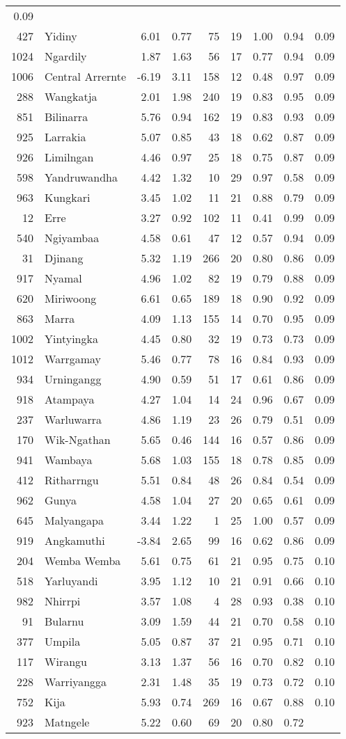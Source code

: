 \begin{longtable}[]{@{}rlrrrrrrr@{}}
0.09\tabularnewline
427 & Yidiny & 6.01 & 0.77 & 75 & 19 & 1.00 & 0.94 & 0.09\tabularnewline
1024 & Ngardily & 1.87 & 1.63 & 56 & 17 & 0.77 & 0.94 &
0.09\tabularnewline
1006 & Central Arrernte & -6.19 & 3.11 & 158 & 12 & 0.48 & 0.97 &
0.09\tabularnewline
288 & Wangkatja & 2.01 & 1.98 & 240 & 19 & 0.83 & 0.95 &
0.09\tabularnewline
851 & Bilinarra & 5.76 & 0.94 & 162 & 19 & 0.83 & 0.93 &
0.09\tabularnewline
925 & Larrakia & 5.07 & 0.85 & 43 & 18 & 0.62 & 0.87 &
0.09\tabularnewline
926 & Limilngan & 4.46 & 0.97 & 25 & 18 & 0.75 & 0.87 &
0.09\tabularnewline
598 & Yandruwandha & 4.42 & 1.32 & 10 & 29 & 0.97 & 0.58 &
0.09\tabularnewline
963 & Kungkari & 3.45 & 1.02 & 11 & 21 & 0.88 & 0.79 &
0.09\tabularnewline
12 & Erre & 3.27 & 0.92 & 102 & 11 & 0.41 & 0.99 & 0.09\tabularnewline
540 & Ngiyambaa & 4.58 & 0.61 & 47 & 12 & 0.57 & 0.94 &
0.09\tabularnewline
31 & Djinang & 5.32 & 1.19 & 266 & 20 & 0.80 & 0.86 &
0.09\tabularnewline
917 & Nyamal & 4.96 & 1.02 & 82 & 19 & 0.79 & 0.88 & 0.09\tabularnewline
620 & Miriwoong & 6.61 & 0.65 & 189 & 18 & 0.90 & 0.92 &
0.09\tabularnewline
863 & Marra & 4.09 & 1.13 & 155 & 14 & 0.70 & 0.95 & 0.09\tabularnewline
1002 & Yintyingka & 4.45 & 0.80 & 32 & 19 & 0.73 & 0.73 &
0.09\tabularnewline
1012 & Warrgamay & 5.46 & 0.77 & 78 & 16 & 0.84 & 0.93 &
0.09\tabularnewline
934 & Urningangg & 4.90 & 0.59 & 51 & 17 & 0.61 & 0.86 &
0.09\tabularnewline
918 & Atampaya & 4.27 & 1.04 & 14 & 24 & 0.96 & 0.67 &
0.09\tabularnewline
237 & Warluwarra & 4.86 & 1.19 & 23 & 26 & 0.79 & 0.51 &
0.09\tabularnewline
170 & Wik-Ngathan & 5.65 & 0.46 & 144 & 16 & 0.57 & 0.86 &
0.09\tabularnewline
941 & Wambaya & 5.68 & 1.03 & 155 & 18 & 0.78 & 0.85 &
0.09\tabularnewline
412 & Ritharrngu & 5.51 & 0.84 & 48 & 26 & 0.84 & 0.54 &
0.09\tabularnewline
962 & Gunya & 4.58 & 1.04 & 27 & 20 & 0.65 & 0.61 & 0.09\tabularnewline
645 & Malyangapa & 3.44 & 1.22 & 1 & 25 & 1.00 & 0.57 &
0.09\tabularnewline
919 & Angkamuthi & -3.84 & 2.65 & 99 & 16 & 0.62 & 0.86 &
0.09\tabularnewline
204 & Wemba Wemba & 5.61 & 0.75 & 61 & 21 & 0.95 & 0.75 &
0.10\tabularnewline
518 & Yarluyandi & 3.95 & 1.12 & 10 & 21 & 0.91 & 0.66 &
0.10\tabularnewline
982 & Nhirrpi & 3.57 & 1.08 & 4 & 28 & 0.93 & 0.38 & 0.10\tabularnewline
91 & Bularnu & 3.09 & 1.59 & 44 & 21 & 0.70 & 0.58 & 0.10\tabularnewline
377 & Umpila & 5.05 & 0.87 & 37 & 21 & 0.95 & 0.71 & 0.10\tabularnewline
117 & Wirangu & 3.13 & 1.37 & 56 & 16 & 0.70 & 0.82 &
0.10\tabularnewline
228 & Warriyangga & 2.31 & 1.48 & 35 & 19 & 0.73 & 0.72 &
0.10\tabularnewline
752 & Kija & 5.93 & 0.74 & 269 & 16 & 0.67 & 0.88 & 0.10\tabularnewline
923 & Matngele & 5.22 & 0.60 & 69 & 20 & 0.80 & 0.72 &

\end{longtable}
